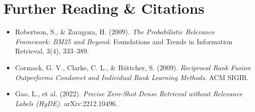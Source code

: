 \section{Further Reading \protect\& Citations}
\begin{itemize}[leftmargin=18pt]
  \item Robertson, S., \& Zaragoza, H. (2009). \emph{The Probabilistic Relevance Framework: BM25 and Beyond}. Foundations and Trends in Information Retrieval, 3(4), 333--389.
  \item Cormack, G. V., Clarke, C. L., \& Büttcher, S. (2009). \emph{Reciprocal Rank Fusion Outperforms Condorcet and Individual Rank Learning Methods}. ACM SIGIR.
  \item Gao, L., et al. (2022). \emph{Precise Zero-Shot Dense Retrieval without Relevance Labels (HyDE)}. arXiv:2212.10496.
\end{itemize}
